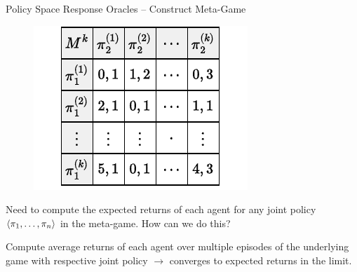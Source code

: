 \begin{frame}[t]{Policy Space Response Oracles -- Construct Meta-Game}
    \begin{minipage}{0.35\textwidth}
        \vspace{2em}
        \begin{figure}
            \centering
            \includegraphics[width=.9\textwidth]{images/chapter_9/psro-game}
        \end{figure}
    \end{minipage}
    \hfill
    \begin{minipage}{0.6\textwidth}
        \begin{problembox}
             Need to compute the expected returns of each agent for any joint policy $\langle \pi_1, \ldots, \pi_n \rangle$ in the meta-game. How can we do this?
        \end{problembox}

        \pause
        \begin{solutionbox}
            Compute average returns of each agent over multiple episodes of the underlying game with respective joint policy $\rightarrow$ converges to expected returns in the limit.
        \end{solutionbox}
    \end{minipage}
\end{frame}

